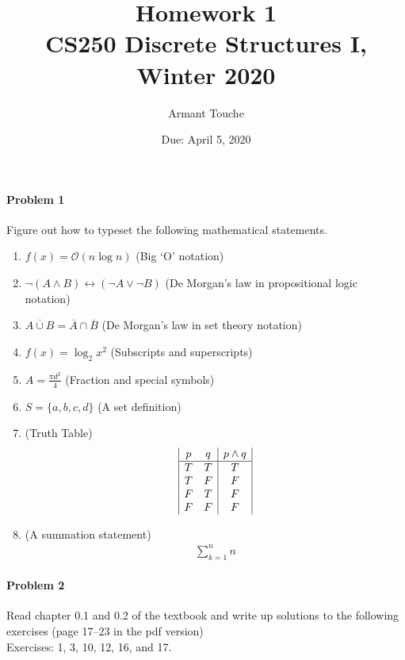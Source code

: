 \documentclass[11pt]{article}
\title{\bf Homework 1\\[1ex]
\rm\normalsize CS250 Discrete Structures I, Winter 2020 }
\date{\normalsize Due: April 5, 2020}
\author{\normalsize Armant Touche}
\begin{document}
\paragraph{Problem 1} Figure out how to typeset the following mathematical statements.

\begin{enumerate}

    \item $f(x) =  \mathcal{O}(n \log n)$ (Big `O' notation)

    \item $\neg(A \land B) \leftrightarrow (\neg A \lor \neg B)$ (De Morgan's law in propositional logic notation)

    \item $\overline{A \cup B} = \overline{A} \cap \overline{B}$ (De Morgan's law in set theory notation)

    \item $f(x) = \log_{2} x^{2}$ (Subscripts and superscripts)

    \item $A = \frac{\pi d^2}{4}$ (Fraction and special symbols)

    \item $S = \{a, b, c, d\}$ (A set definition)

    \item (Truth Table)
        \begin{align*} 

			\begin{array}{|c c|c|} %
			p & q & p \land q\\ %
			\hline %
			T & T & T\\
			T & F & F\\
			F & T & F\\
			F & F & F\\
			\end{array}

        \end{align*}

    \item (A summation statement)
		\begin{align*}
			\sum_{k=1}^{n}n 
		\end{align*}

\end{enumerate}

\paragraph{Problem 2} Read chapter 0.1 and 0.2 of the textbook and write up solutions to the following exercises (page 17--23 in the pdf version)\\

Exercises: 1, 3, 10, 12, 16, and 17.\\
\end{document}
